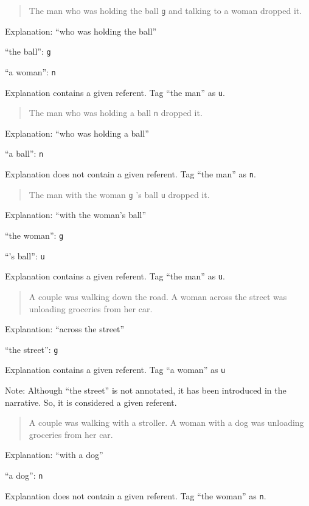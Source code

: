\documentclass[
]{book}
\begin{document}
\begin{quote}
The man who was holding the ball \texttt{g} and talking to a woman dropped it.
\end{quote}

Explanation: ``who was holding the ball''

``the ball'': \texttt{g}

``a woman'': \texttt{n}

Explanation contains a given referent.
Tag ``the man'' as \texttt{u}.

\begin{quote}
The man who was holding a ball \texttt{n} dropped it.
\end{quote}

Explanation: ``who was holding a ball''

``a ball'': \texttt{n}

Explanation does not contain a given referent.
Tag ``the man'' as \texttt{n}.

\begin{quote}
The man with the woman \texttt{g} 's ball \texttt{u} dropped it.
\end{quote}

Explanation: ``with the woman's ball''

``the woman'': \texttt{g}

``'s ball'': \texttt{u}

Explanation contains a given referent.
Tag ``the man'' as \texttt{u}.

\begin{quote}
A couple was walking down the road.
A woman across the street was unloading groceries from her car.
\end{quote}

Explanation: ``across the street''

``the street'': \texttt{g}

Explanation contains a given referent.
Tag ``a woman'' as \texttt{u}

Note: Although ``the street'' is not annotated, it has been introduced in the narrative.
So, it is considered a given referent.

\begin{quote}
A couple was walking with a stroller.
A woman with a dog was unloading groceries from her car.
\end{quote}

Explanation: ``with a dog''

``a dog'': \texttt{n}

Explanation does not contain a given referent.
Tag ``the woman'' as \texttt{n}.
\end{document}
